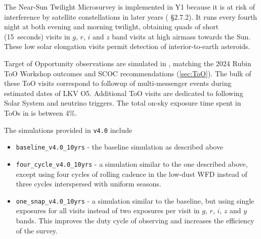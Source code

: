 The Near-Sun Twilight Microsurvey is implemented in Y1 because it is at risk of interference by satellite constellations in later years ( \S2.7.2). It runs every fourth night at both evening and morning twilight, obtaining quads of short (15~seconds) visits in $g$, $r$, $i$ and $z$ band visits at high airmass towards the Sun. These low solar elongation visits permit detection of interior-to-earth asteroids. %

Target of Opportunity observations are simulated in , matching the 2024 Rubin ToO Workshop outcomes and SCOC recommendations (\autoref{sec:ToO}). The bulk of these ToO visits correspond to followup of multi-messenger events during estimated dates of LKV O5. Additional ToO visits are dedicated to following Solar System and neutrino triggers. The total on-sky exposure time spent in ToOs in  is between  4\%. 

The simulations provided in \texttt{v4.0} include
\begin{itemize}
    \item \texttt{baseline\_v4.0\_10yrs} - the baseline simulation as described above
    \item \texttt{four\_cycle\_v4.0\_10yrs} - a simulation similar to the one described above, except using four cycles of rolling cadence in the low-dust WFD instead of three cycles interspersed with uniform seasons. 
    \item \texttt{one\_snap\_v4.0\_10yrs} - a simulation similar to the baseline, but using single exposures for all visits instead of two exposures per visit in $g$, $r$, $i$, $z$ and $y$ bands. This improves the duty cycle of observing and increases the efficiency of the survey.
\end{itemize}
